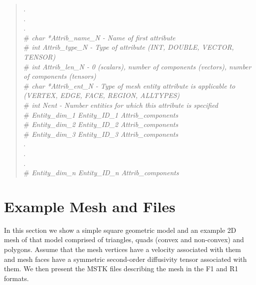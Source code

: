 \documentclass[12pt]{article}
\begin{document}
\begin{verse}
. \\
. \\
. \\


\# {\em char *Attrib\_name\_N - Name of first attribute} \\
\# {\em int Attrib\_type\_N - Type of  attribute (INT, DOUBLE, VECTOR, TENSOR)} \\
\# {\em int Attrib\_len\_N - 0 (scalars), number of components (vectors), number of components (tensors)} \\
\# {\em char *Attrib\_ent\_N - Type of mesh entity attribute is applicable to (VERTEX, EDGE, FACE, REGION, ALLTYPES)} \\
\vspace{1ex}
\# {\em int Nent - Number entities for which this attribute is specified} \\
\# {\em Entity\_dim\_1 \hspace{0.5ex} Entity\_ID\_1 \hspace{0.5ex} Attrib\_components} \\ 
\# {\em Entity\_dim\_2 \hspace{0.5ex} Entity\_ID\_2 \hspace{0.5ex} Attrib\_components} \\ 
\# {\em Entity\_dim\_3 \hspace{0.5ex} Entity\_ID\_3 \hspace{0.5ex} Attrib\_components} \\ 
.\\
.\\
.\\
\# {\em Entity\_dim\_n \hspace{0.5ex} Entity\_ID\_n \hspace{0.5ex} Attrib\_components}
\vspace{1ex}
\vspace{2ex}

\end{verse}

\newpage

\section{Example Mesh and Files}

In this section we show a simple square geometric model and an example
2D mesh of that model comprised of triangles, quads (convex and
non-convex) and polygons. Assume that the mesh vertices have a
velocity associated with them and mesh faces have a symmetric
second-order diffusivity tensor associated with them. We then
present the MSTK files describing the mesh in the F1 and R1 formats.
\end{document}
